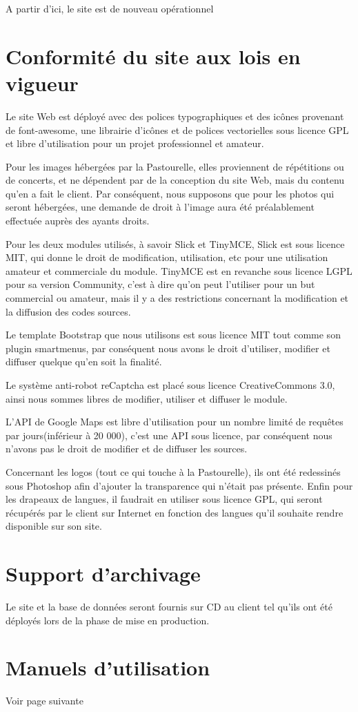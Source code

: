 \documentclass[11pt]{report}
\begin{document}
\par A partir d'ici, le site est de nouveau opérationnel

\section{Conformité du site aux lois en vigueur}
Le site Web est déployé avec des polices typographiques et des icônes provenant
de font-awesome, une librairie d’icônes et de polices vectorielles sous licence
GPL et libre d'utilisation pour un projet professionnel et amateur. \\

\par Pour les images hébergées par la Pastourelle, elles proviennent de 
répétitions ou de concerts, et ne dépendent par de la conception du site Web, 
mais du contenu qu'en a fait le client. Par conséquent, nous supposons que pour 
les photos qui seront hébergées, une demande de droit à l'image aura été 
préalablement effectuée auprès des ayants droits. \\

\par Pour les deux modules utilisés, à savoir Slick et TinyMCE, Slick est sous
licence MIT, qui donne le droit de modification, utilisation, etc pour une
utilisation amateur et commerciale du module. TinyMCE est en revanche sous
licence LGPL pour sa version Community, c'est à dire qu'on peut l'utiliser pour
un but commercial ou amateur, mais il y a des restrictions concernant la
modification et la diffusion des codes sources. \\

\par Le template Bootstrap que nous utilisons est sous licence MIT tout comme
son plugin smartmenus, par conséquent nous avons le droit d'utiliser, modifier
et diffuser quelque qu'en soit la finalité. \\

\par Le système anti-robot reCaptcha est placé sous licence CreativeCommons 3.0,
ainsi nous sommes libres de modifier, utiliser et diffuser le module. \\

\par L'API de Google Maps est libre d'utilisation pour un nombre limité de
requêtes par jours(inférieur à 20 000), c'est une API sous licence, par
conséquent nous n'avons pas le droit de modifier et de diffuser les sources.

\par Concernant les logos (tout ce qui touche à la Pastourelle), ils ont été
redessinés sous Photoshop afin d'ajouter la transparence qui n'était pas
présente. Enfin pour les drapeaux de langues, il faudrait en utiliser sous
licence GPL, qui seront récupérés par le client sur Internet en fonction des
langues qu'il souhaite rendre disponible sur son site.

\section{Support d'archivage}
Le site et la base de données seront fournis sur CD au client tel qu'ils
ont été déployés lors de la phase de mise en production.

\section{Manuels d'utilisation}
Voir page suivante

\end{document}
